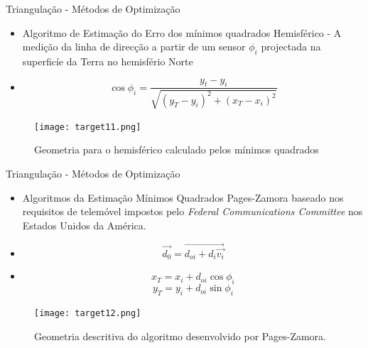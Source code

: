\documentclass[portuguese,10pt]{beamer}
\begin{document}
\begin{frame}{Triangulação - Métodos de Optimização}
   
    \begin{itemize}
 
        \item Algoritmo de Estimação do Erro dos mínimos quadrados Hemisférico - A medição da linha de direcção a partir de um sensor $\phi_i$ projectada na superficíe da Terra no hemisfério Norte
        
        \item \begin{equation*}
    \cos{\phi_i}= \frac{y_t - y_i}{\sqrt{(y_T - y_i)^2+(x_T - x_i)^2}}
\end{equation*}
       
    \end{itemize}
    \begin{figure}[ht]
\centering
\texttt{[image: target11.png]}
\caption{Geometria para o hemisférico calculado pelos mínimos quadrados}
\label{target11}
\end{figure}
\end{frame}


\begin{frame}{Triangulação - Métodos de Optimização}
   
    \begin{itemize}
 
        \item Algoritmos da Estimação Mínimos Quadrados Pages-Zamora baseado nos requisitos de telemóvel impostos pelo \textit{Federal Communications Committee} nos Estados Unidos da América.
        
        \item \begin{equation*}
    \Vec{d_0}= \Vec{d_{oi}+ d_i\Vec{v_i}} 
\end{equation*}

    \item \begin{equation*}
    x_T = x_i + d_{oi}\cos{\phi_i}
\end{equation*}
\begin{equation*}
    y_T = y_i + d_{oi}\sin{\phi_i}
\end{equation*}
       
    \end{itemize}
    \begin{figure}[ht]
\centering
\texttt{[image: target12.png]}
\caption{Geometria descritiva do algoritmo desenvolvido por Pages-Zamora.}
\label{target12}
\end{figure}
\end{frame}
\end{document}
